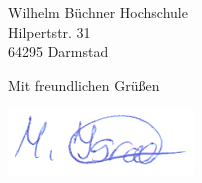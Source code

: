 \documentclass[
    version=last,           %
    DIV=13,                 %
    BCOR=0mm,               %
    paper=a4,               %
    fontsize=12pt,          %
    firsthead=on,           %
    firstfoot=on,           %
    pagenumber=on,i         %
    parskip=half,           %
    enlargefirstpage=,      %
    firsthead=on,           %
    fromrule=afteraddress,  %
    priority=off,           %
    backaddress=true,       %
    refline=dateright,      %
	fromalign=right,	    %
    fromemail=on,i          %
    fromurl=on,             %
    frombank=on,
    fromphone=on,           %
    frommobilephone=on      %
    fromlogo=on,            %
    addrfield=on,           %
    subject=untitled,  %
    foldmarks=off,          %
    numericaldate=off,      %
	pagenumber=right,	        %
	parskip=half,	        %
    headsep=false,          %
    footsepline=true,       %
    foldmarks=off,		    %
	]{scrlttr2}
\begin{document}
\begin{letter} {Wilhelm Büchner Hochschule \\
Hilpertstr. 31\\
64295 Darmstad}
\closing{Mit freundlichen Grüßen}
    \includegraphics[scale=0.70]{../unterschrift.png}




%





\end{letter}
\end{document}
